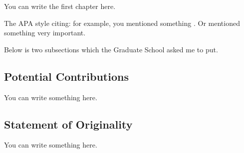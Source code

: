 You can write the first chapter here. 

The APA style citing: for example, you mentioned something \cite{abelson1985variance}. Or  mentioned something very important. 

Below is two subsections which the Graduate School asked me to put. 

\subsection{Potential Contributions}
You can write something here.

\subsection{Statement of Originality}
You can write something here. 